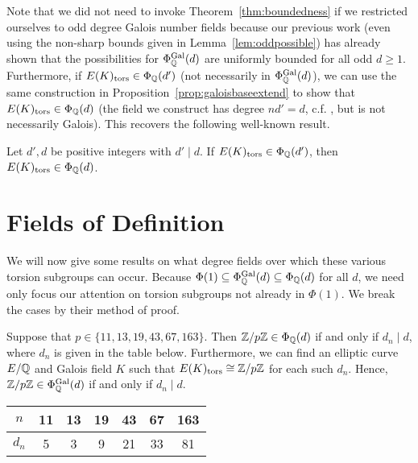 Note that we did not need to invoke Theorem~\ref{thm:boundedness} if we restricted ourselves to odd degree Galois number fields because our previous work (even using the non-sharp bounds given in Lemma~\ref{lem:oddpossible}) has already shown that the possibilities for $\Phi_{\mathbb{Q}}^{\operatorname{Gal}}(d)$ are uniformly bounded for all odd $d \geq 1$. Furthermore, if $E(K)_{\text{tors}} \in \Phi_{\mathbb{Q}}(d')$ (not necessarily in $\Phi_{\mathbb{Q}}^{\operatorname{Gal}}(d)$), we can use the same construction in Proposition~\ref{prop:galoisbaseextend} to show that $E(K)_{\text{tors}} \in \Phi_{\mathbb{Q}}(d)$ (the field we construct has degree $nd'=d$, c.f. \cite[Ch.~14.4, Cor.~20]{dummitfoote}, but is not necessarily Galois). This recovers the following well-known result. 


\begin{cor} \label{cor:obvious}
Let $d', d$ be positive integers with $d' \mid d$. If $E(K)_{\text{tors}} \in \Phi_{\mathbb{Q}}(d')$, then $E(K)_{\text{tors}} \in \Phi_{\mathbb{Q}}(d)$.
\end{cor}





\section{Fields of Definition}

We will now give some results on what degree fields over which these various torsion subgroups can occur. Because $\Phi(1) \subseteq \Phi_{\mathbb{Q}}^{\operatorname{Gal}}(d) \subseteq \Phi_{\mathbb{Q}}(d)$ for all $d$, we need only focus our attention on torsion subgroups not already in $\Phi(1)$. We break the cases by their method of proof. 


\begin{lem} \label{lem:oddgalfinp}
Suppose that $p \in \{ 11, 13, 19, 43, 67, 163 \}$. Then $\mathbb{Z}/p\mathbb{Z} \in \Phi_{\mathbb{Q}}(d)$ if and only if $d_n \mid d$, where $d_n$ is given in the table below. Furthermore, we can find an elliptic curve $E/\mathbb{Q}$ and Galois field $K$ such that $E(K)_{\text{tors}} \cong \mathbb{Z}/p\mathbb{Z}$ for each such $d_n$. Hence, $\mathbb{Z}/p\mathbb{Z} \in \Phi_{\mathbb{Q}}^{\operatorname{Gal}}(d)$ if and only if $d_n \mid d$.
	\begin{table}[!ht]
	\centering
	\begin{tabular}{|c||cccccc|} \hline
	$n$ & 11 & 13 & 19 & 43 & 67 & 163 \\ \hline
	$d_n$ & 5 & 3 & 9 & 21 & 33 & 81 \\ \hline
	\end{tabular}
	\end{table}
\end{lem}


